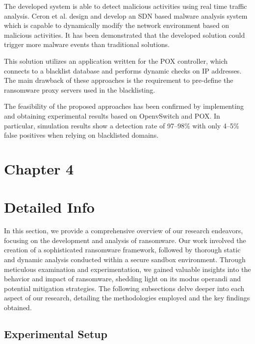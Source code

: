 \documentclass[12pt,letterpaper]{article}
\begin{document}
    The developed system is able to detect malicious activities using real time traffic analysis. Ceron et al. \cite{7543792} design and develop an SDN based malware analysis system which is capable to dynamically modify the network environment based on malicious activities. It has been demonstrated that the developed solution could trigger more malware events than traditional solutions.

    This solution utilizes an application written for the POX controller, which connects to a blacklist database and performs dynamic checks on IP addresses. The main drawback of these approaches is the requirement to pre-define the ransomware proxy servers used in the blacklisting.

    The feasibility of the proposed approaches has been confirmed by implementing and obtaining experimental results based on OpenvSwitch and POX. In particular, simulation results show a detection rate of 97–98\% with only 4–5\% false positives when relying on blacklisted domains.
            
\clearpage    
    \newpage
    \section*{Chapter 4}
        \section{Detailed Info}

            In this section, we provide a comprehensive overview of our research endeavors, focusing on the development and analysis of ransomware. Our work involved the creation of a sophisticated ransomware framework, followed by thorough static and dynamic analysis conducted within a secure sandbox environment. Through meticulous examination and experimentation, we gained valuable insights into the behavior and impact of ransomware, shedding light on its modus operandi and potential mitigation strategies. The following subsections delve deeper into each aspect of our research, detailing the methodologies employed and the key findings obtained.
            
            
        \subsection{Experimental Setup}
\end{document}
